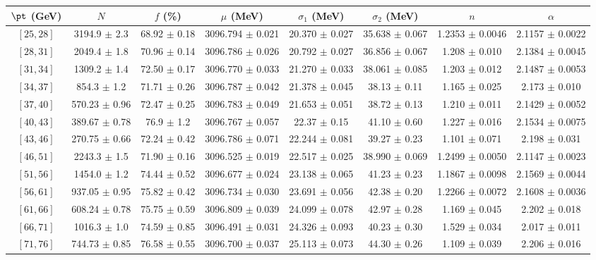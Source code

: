 \begin{tabular}{c||c|c|c|c|c|c|c}
$\pt$ (GeV) & $N$ & $f$ (\%) & $\mu$ (MeV) & $\sigma_1$ (MeV) & $\sigma_2$ (MeV) & $n$ & $\alpha$ \\
\hline
$[25, 28]$ & 3194.9 $\pm$ 2.3 & 68.92 $\pm$ 0.18 & 3096.794 $\pm$ 0.021 & 20.370 $\pm$ 0.027 & 35.638 $\pm$ 0.067 & 1.2353 $\pm$ 0.0046 & 2.1157 $\pm$ 0.0022\\
$[28, 31]$ & 2049.4 $\pm$ 1.8 & 70.96 $\pm$ 0.14 & 3096.786 $\pm$ 0.026 & 20.792 $\pm$ 0.027 & 36.856 $\pm$ 0.067 & 1.208 $\pm$ 0.010 & 2.1384 $\pm$ 0.0045\\
$[31, 34]$ & 1309.2 $\pm$ 1.4 & 72.50 $\pm$ 0.17 & 3096.770 $\pm$ 0.033 & 21.270 $\pm$ 0.033 & 38.061 $\pm$ 0.085 & 1.203 $\pm$ 0.012 & 2.1487 $\pm$ 0.0053\\
$[34, 37]$ & 854.3 $\pm$ 1.2 & 71.71 $\pm$ 0.26 & 3096.787 $\pm$ 0.042 & 21.378 $\pm$ 0.045 & 38.13 $\pm$ 0.11 & 1.165 $\pm$ 0.025 & 2.173 $\pm$ 0.010\\
$[37, 40]$ & 570.23 $\pm$ 0.96 & 72.47 $\pm$ 0.25 & 3096.783 $\pm$ 0.049 & 21.653 $\pm$ 0.051 & 38.72 $\pm$ 0.13 & 1.210 $\pm$ 0.011 & 2.1429 $\pm$ 0.0052\\
$[40, 43]$ & 389.67 $\pm$ 0.78 & 76.9 $\pm$ 1.2 & 3096.767 $\pm$ 0.057 & 22.37 $\pm$ 0.15 & 41.10 $\pm$ 0.60 & 1.227 $\pm$ 0.016 & 2.1534 $\pm$ 0.0075\\
$[43, 46]$ & 270.75 $\pm$ 0.66 & 72.24 $\pm$ 0.42 & 3096.786 $\pm$ 0.071 & 22.244 $\pm$ 0.081 & 39.27 $\pm$ 0.23 & 1.101 $\pm$ 0.071 & 2.198 $\pm$ 0.031\\
$[46, 51]$ & 2243.3 $\pm$ 1.5 & 71.90 $\pm$ 0.16 & 3096.525 $\pm$ 0.019 & 22.517 $\pm$ 0.025 & 38.990 $\pm$ 0.069 & 1.2499 $\pm$ 0.0050 & 2.1147 $\pm$ 0.0023\\
$[51, 56]$ & 1454.0 $\pm$ 1.2 & 74.44 $\pm$ 0.52 & 3096.677 $\pm$ 0.024 & 23.138 $\pm$ 0.065 & 41.23 $\pm$ 0.23 & 1.1867 $\pm$ 0.0098 & 2.1569 $\pm$ 0.0044\\
$[56, 61]$ & 937.05 $\pm$ 0.95 & 75.82 $\pm$ 0.42 & 3096.734 $\pm$ 0.030 & 23.691 $\pm$ 0.056 & 42.38 $\pm$ 0.20 & 1.2266 $\pm$ 0.0072 & 2.1608 $\pm$ 0.0036\\
$[61, 66]$ & 608.24 $\pm$ 0.78 & 75.75 $\pm$ 0.59 & 3096.809 $\pm$ 0.039 & 24.099 $\pm$ 0.078 & 42.97 $\pm$ 0.28 & 1.169 $\pm$ 0.045 & 2.202 $\pm$ 0.018\\
$[66, 71]$ & 1016.3 $\pm$ 1.0 & 74.59 $\pm$ 0.85 & 3096.491 $\pm$ 0.031 & 24.326 $\pm$ 0.093 & 40.23 $\pm$ 0.30 & 1.529 $\pm$ 0.034 & 2.017 $\pm$ 0.011\\
$[71, 76]$ & 744.73 $\pm$ 0.85 & 76.58 $\pm$ 0.55 & 3096.700 $\pm$ 0.037 & 25.113 $\pm$ 0.073 & 44.30 $\pm$ 0.26 & 1.109 $\pm$ 0.039 & 2.206 $\pm$ 0.016\\

\end{tabular}
